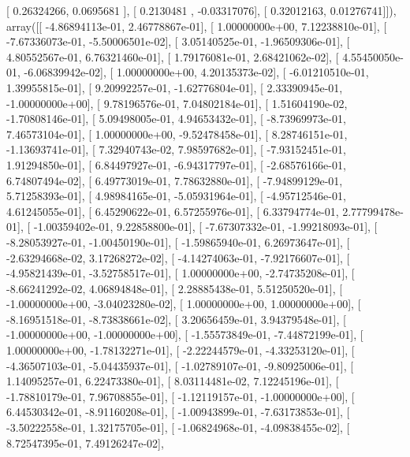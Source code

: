 \documentclass{article}
\begin{document}
       [ 0.26324266,  0.0695681 ],
       [ 0.2130481 , -0.03317076],
       [ 0.32012163,  0.01276741]]), array([[ -4.86894113e-01,   2.46778867e-01],
       [  1.00000000e+00,   7.12238810e-01],
       [ -7.67336073e-01,  -5.50006501e-02],
       [  3.05140525e-01,  -1.96509306e-01],
       [  4.80552567e-01,   6.76321460e-01],
       [  1.79176081e-01,   2.68421062e-02],
       [  4.55450050e-01,  -6.06839942e-02],
       [  1.00000000e+00,   4.20135373e-02],
       [ -6.01210510e-01,   1.39955815e-01],
       [  9.20992257e-01,  -1.62776804e-01],
       [  2.33390945e-01,  -1.00000000e+00],
       [  9.78196576e-01,   7.04802184e-01],
       [  1.51604190e-02,  -1.70808146e-01],
       [  5.09498005e-01,   4.94653432e-01],
       [ -8.73969973e-01,   7.46573104e-01],
       [  1.00000000e+00,  -9.52478458e-01],
       [  8.28746151e-01,  -1.13693741e-01],
       [  7.32940743e-02,   7.98597682e-01],
       [ -7.93152451e-01,   1.91294850e-01],
       [  6.84497927e-01,  -6.94317797e-01],
       [ -2.68576166e-01,   6.74807494e-02],
       [  6.49773019e-01,   7.78632880e-01],
       [ -7.94899129e-01,   5.71258393e-01],
       [  4.98984165e-01,  -5.05931964e-01],
       [ -4.95712546e-01,   4.61245055e-01],
       [  6.45290622e-01,   6.57255976e-01],
       [  6.33794774e-01,   2.77799478e-01],
       [ -1.00359402e-01,   9.22858800e-01],
       [ -7.67307332e-01,  -1.99218093e-01],
       [ -8.28053927e-01,  -1.00450190e-01],
       [ -1.59865940e-01,   6.26973647e-01],
       [ -2.63294668e-02,   3.17268272e-02],
       [ -4.14274063e-01,  -7.92176607e-01],
       [ -4.95821439e-01,  -3.52758517e-01],
       [  1.00000000e+00,  -2.74735208e-01],
       [ -8.66241292e-02,   4.06894848e-01],
       [  2.28885438e-01,   5.51250520e-01],
       [ -1.00000000e+00,  -3.04023280e-02],
       [  1.00000000e+00,   1.00000000e+00],
       [ -8.16951518e-01,  -8.73838661e-02],
       [  3.20656459e-01,   3.94379548e-01],
       [ -1.00000000e+00,  -1.00000000e+00],
       [ -1.55573849e-01,  -7.44872199e-01],
       [  1.00000000e+00,  -1.78132271e-01],
       [ -2.22244579e-01,  -4.33253120e-01],
       [ -4.36507103e-01,  -5.04435937e-01],
       [ -1.02789107e-01,  -9.80925006e-01],
       [  1.14095257e-01,   6.22473380e-01],
       [  8.03114481e-02,   7.12245196e-01],
       [ -1.78810179e-01,   7.96708855e-01],
       [ -1.12119157e-01,  -1.00000000e+00],
       [  6.44530342e-01,  -8.91160208e-01],
       [ -1.00943899e-01,  -7.63173853e-01],
       [ -3.50222558e-01,   1.32175705e-01],
       [ -1.06824968e-01,  -4.09838455e-02],
       [  8.72547395e-01,   7.49126247e-02],
\end{document}
